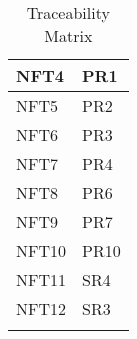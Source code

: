 \documentclass[12pt, titlepage]{article}
\begin{document}
\begin{longtable}{| p{} | p{} |}
    \hline
    NFT4 & PR1\\
    \hline
    NFT5 & PR2\\
    \hline
    NFT6 & PR3\\
    \hline
    NFT7 & PR4\\
    \hline
    NFT8 & PR6\\
    \hline
    NFT9 & PR7\\
    \hline
    NFT10 & PR10\\
    \hline
    NFT11 & SR4\\
    \hline
    NFT12 & SR3\\
    \hline
\caption{Traceability Matrix}
\end{longtable}







\end{document}
